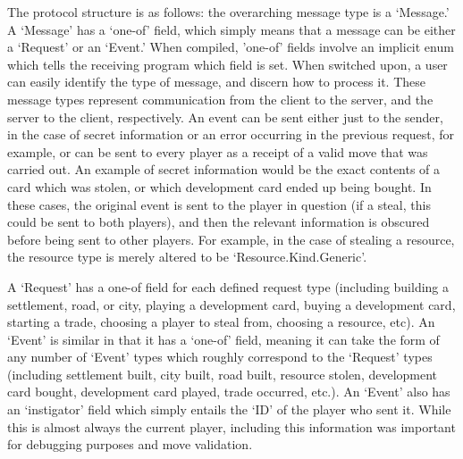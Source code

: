 \documentclass[a4paper,doc,draftfirst]{apa6}
\begin{document}
The protocol structure is as follows: the overarching message type is a ‘Message.’ A ‘Message’ has a ‘one-of’ field, which simply means that a message can be either a ‘Request’ or an ‘Event.’ When compiled, 'one-of' fields involve an implicit enum which tells the receiving program which field is set. When switched upon, a user can easily identify the type of message, and discern how to process it. These message types represent communication from the client to the server, and the server to the client, respectively. An event can be sent either just to the sender, in the case of secret information or an error occurring in the previous request, for example, or can be sent to every player as a receipt of a valid move that was carried out. An example of secret information would be the exact contents of a card which was stolen, or which development card ended up being bought. In these cases, the original event is sent to the player in question (if a steal, this could be sent to both players), and then the relevant information is obscured before being sent to other players. For example, in the case of stealing a resource, the resource type is merely altered to be ‘Resource.Kind.Generic’.

A ‘Request’ has a one-of field for each defined request type (including building a settlement, road, or city, playing a development card, buying a development card, starting a trade, choosing a player to steal from, choosing a resource, etc). An ‘Event’ is similar in that it has a ‘one-of’ field, meaning it can take the form of any number of ‘Event’ types which roughly correspond to the ‘Request’ types (including settlement built, city built, road built, resource stolen, development card bought, development card played, trade occurred, etc.). An ‘Event’ also has an ‘instigator’ field which simply entails the ‘ID’ of the player who sent it. While this is almost always the current player, including this information was important for debugging purposes and move validation.
\end{document}
